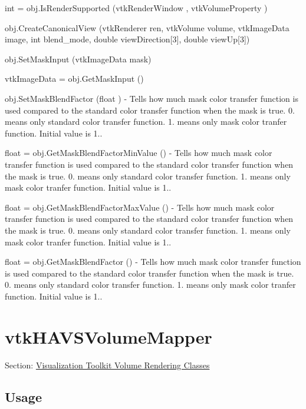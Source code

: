 \begin{DoxyItemize}
\item {\ttfamily int = obj.\-Is\-Render\-Supported (vtk\-Render\-Window , vtk\-Volume\-Property )}  
\item {\ttfamily obj.\-Create\-Canonical\-View (vtk\-Renderer ren, vtk\-Volume volume, vtk\-Image\-Data image, int blend\-\_\-mode, double view\-Direction\mbox{[}3\mbox{]}, double view\-Up\mbox{[}3\mbox{]})}  
\item {\ttfamily obj.\-Set\-Mask\-Input (vtk\-Image\-Data mask)}  
\item {\ttfamily vtk\-Image\-Data = obj.\-Get\-Mask\-Input ()}  
\item {\ttfamily obj.\-Set\-Mask\-Blend\-Factor (float )} -\/ Tells how much mask color transfer function is used compared to the standard color transfer function when the mask is true. 0. means only standard color transfer function. 1. means only mask color tranfer function. Initial value is 1..  
\item {\ttfamily float = obj.\-Get\-Mask\-Blend\-Factor\-Min\-Value ()} -\/ Tells how much mask color transfer function is used compared to the standard color transfer function when the mask is true. 0. means only standard color transfer function. 1. means only mask color tranfer function. Initial value is 1..  
\item {\ttfamily float = obj.\-Get\-Mask\-Blend\-Factor\-Max\-Value ()} -\/ Tells how much mask color transfer function is used compared to the standard color transfer function when the mask is true. 0. means only standard color transfer function. 1. means only mask color tranfer function. Initial value is 1..  
\item {\ttfamily float = obj.\-Get\-Mask\-Blend\-Factor ()} -\/ Tells how much mask color transfer function is used compared to the standard color transfer function when the mask is true. 0. means only standard color transfer function. 1. means only mask color tranfer function. Initial value is 1..  
\end{DoxyItemize}\hypertarget{vtkvolumerendering_vtkhavsvolumemapper}{}\section{vtk\-H\-A\-V\-S\-Volume\-Mapper}\label{vtkvolumerendering_vtkhavsvolumemapper}
Section\-: \hyperlink{sec_vtkvolumerendering}{Visualization Toolkit Volume Rendering Classes} \hypertarget{vtkwidgets_vtkxyplotwidget_Usage}{}\subsection{Usage}\label{vtkwidgets_vtkxyplotwidget_Usage}
